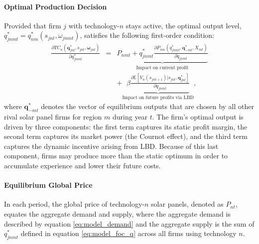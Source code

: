 \documentclass[12pt]{article}
\begin{document}
\paragraph{Optimal Production Decision}
Provided that firm $j$ with technology-$n$ stays active, the optimal output level, $q_{jnmt}^*=q_{nm}^*(s_{jnt},\omega_{jnmt})$, satisfies the following first-order condition:
 \begin{eqnarray}
 \frac{\partial TC_{n}(\boldsymbol{q}_{jnt}^*,s_{jnt},\boldsymbol{\omega}_{jnt})}{\partial q_{jnmt}^*} & = & \underbrace{
    P_{nmt}+q_{jnmt}^*\frac{\partial P_{nm}(q^*_{jnmt}, \boldsymbol{q}^*_{-mt},X_{mt})}{\partial q_{jnmt}}}_{\text{Impact on current profit}} \nonumber \\
    && +  \underbrace{\beta \frac{\partial \mathbb{E}[V_n(s_{jnt+1})|s_{jnt}, \boldsymbol{q}_{jnt}^*] }{\partial q_{jnmt}} }_{\text{Impact on future profits via LBD}}, \label{eq:model_foc_q}
\end{eqnarray}  
where $\boldsymbol{q}^*_{-mt}$ denotes the vector of equilibrium outputs that are chosen by all other rival solar panel firms for region $m$ during year $t$. The firm’s optimal output is driven by three components: the first term captures its static profit margin, the second term captures its market power (the Cournot effect), and the third term captures the dynamic incentive arising from LBD. Because of this last component, firms may produce more than the static optimum in order to accumulate experience and lower their future costs.

\paragraph{Equilibrium Global Price}
In each period, the global price of technology-$n$ solar panels, denoted as $P_{nt}$, equates the aggregate demand and supply, where the aggregate demand is described by equation \eqref{eq:model_demand} and the aggregate supply is the sum of $q_{jnmt}^*$ defined in equation \eqref{eq:model_foc_q} across all firms using technology $n$.  
\end{document}
